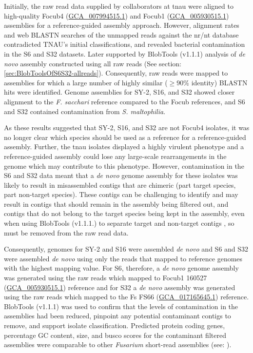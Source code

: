 Initially, the raw read data supplied by collaborators at \ac{tnau} were aligned to high-quality \ac{Focub4} (\href{https://www.ncbi.nlm.nih.gov/datasets/genome/GCA_007994515.1/}{GCA\_007994515.1}) and \ac{Focub1} (\href{https://www.ncbi.nlm.nih.gov/datasets/genome/GCA_005930515.1/}{GCA\_005930515.1})  assemblies for a reference-guided assembly approach. However, alignment rates and web BLASTN searches of the unmapped reads against the nr/nt database contradicted TNAU's initial classifications, and revealed bacterial contamination in the S6 and S32 datasets. Later supported by BlobTools (v1.1.1) analysis of \textit{de novo} assembly constructed using all raw reads (See section: \ref{sec:BlobToolsOfS6S32-allreads}). Consequently, raw reads were mapped to assemblies for which a large number of highly similar ($ \geq90\% $ identity) BLASTN hits were identified. Genome assemblies for SY-2, S16, and S32 showed closer alignment to the \textit{F. sacchari} reference compared to the \ac{Focub} references, and S6 and S32 contained contamination from \textit{S. maltophilia}.

As these results suggested that SY-2, S16, and S32 are not \ac{Focub4} isolates, it was no longer clear which species should be used as a reference for a reference-guided assembly. Further, the \ac{tnau} isolates displayed a highly virulent phenotype and a reference-guided assembly could lose any large-scale rearrangements in the genome which may contribute to this phenotype. However, contamination in the S6 and S32 data meant that a \textit{de novo} genome assembly for these isolates was likely to result in misassembled contigs that are chimeric (part target species, part non-target species). These contigs can be challenging to identify and may result in contigs that should remain in the assembly being filtered out, and contigs that do not belong to the target species being kept in the assembly, even when using BlobTools (v1.1.1.) to separate target and non-target contigs \parencite{Cornet2022}, so must be removed from the raw read data. 

Consequently, genomes for SY-2 and S16 were assembled \textit{de novo} and S6 and S32 were assembled \textit{de novo} using only the reads that mapped to reference genomes with the highest mapping value. For S6, therefore, a \textit{de novo} genome assembly was generated using the raw reads which mapped to \ac{Focub1} 160527 (\href{https://www.ncbi.nlm.nih.gov/datasets/genome/GCA_005930515.1/}{GCA\_005930515.1}) reference and for S32 a \textit{de novo} assembly was generated using the raw reads which mapped to the \ac{Fs} FS66 (\href{https://www.ncbi.nlm.nih.gov/datasets/genome/GCA_017165645.1/}{GCA\_017165645.1}) reference. BlobTools (v1.1.1) was used to confirm that the levels of contamination in the assemblies had been reduced, pinpoint any potential contaminant contigs to remove, and support isolate classification. Predicted protein coding genes, percentage GC content, size, and \ac{busco} scores for the contaminant filtered assemblies were comparable to other \textit{Fusarium} short-read assemblies (see: \textcite{DitaHerai2013, Chiara2015, Srivastava2018}).

